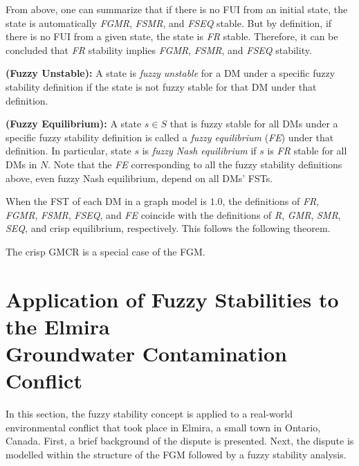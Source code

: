 \noindent From above, one can summarize that if there is no FUI from an initial state, the state is automatically \emph{FGMR}, \emph{FSMR}, and \emph{FSEQ} stable. But by definition, if there is no FUI from a given state, the state is \emph{FR} stable. Therefore, it can be concluded that \emph{FR} stability implies \emph{FGMR}, \emph{FSMR}, and \emph{FSEQ} stability.

\begin{definition}
\rm {\bf (Fuzzy Unstable):} A state is \emph{fuzzy unstable} for a DM under a specific fuzzy stability definition if the state is not fuzzy stable for that DM under that definition.
\end{definition}

\begin{definition}
\rm {\bf (Fuzzy Equilibrium):} A state $s \in S$ that is fuzzy stable for all DMs under a specific fuzzy stability definition is called a \emph{fuzzy equilibrium} (\emph{FE}) under that definition. In particular, state $s$ is \emph{fuzzy Nash equilibrium} if $s$ is \emph{FR} stable for all DMs in $N$. Note that the \emph{FE} corresponding to all the fuzzy stability definitions above, even fuzzy Nash equilibrium, depend on all DMs' FSTs.
\end{definition}

When the FST of each DM in a graph model is $1.0$, the definitions of \emph{FR}, \emph{FGMR}, \emph{FSMR}, \emph{FSEQ}, and \emph{FE} coincide with the definitions of \emph{R}, \emph{GMR}, \emph{SMR}, \emph{SEQ}, and crisp equilibrium, respectively. This follows the following theorem.

\begin{theorem}\label{thm-cgm-sc-fgm}
\rm The crisp GMCR is a special case of the FGM.
\end{theorem}


\section{Application of Fuzzy Stabilities to the Elmira
\\Groundwater Contamination Conflict}\label{sec-stabl-appl-elmira}

In this section, the fuzzy stability concept is applied to a real-world environmental conflict that took place in Elmira, a small town in Ontario, Canada. First, a brief background of the dispute is presented. Next, the dispute is modelled within the structure of the FGM followed by a fuzzy stability analysis.

